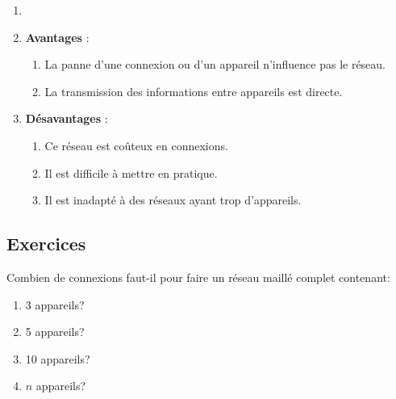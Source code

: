 \documentclass[11pt, a4paper]{book}
\begin{document}
\begin{remarques}
\begin{enumerate}
\item[]
\item {\bf Avantages} : 
	\begin{enumerate}
		\item La panne d'une connexion ou d'un appareil n'influence pas le réseau.
		\item  La transmission des informations entre appareils est directe.\\
	\end{enumerate}
\item {\bf Désavantages} :
	\begin{enumerate}
		\item Ce réseau est coûteux en connexions.
		\item Il est difficile à mettre en pratique.
		\item Il est inadapté à des réseaux ayant trop d'appareils.
	\end{enumerate}
\end{enumerate}
\end{remarques}

\subsection{Exercices}

\begin{exercice}
Combien de connexions faut-il pour faire un réseau maillé complet contenant:
\begin{enumerate}
	\item 3 appareils?
	\item 5 appareils?
	\item 10 appareils?
	\item $n$ appareils?
\end{enumerate}
\end{exercice}
\end{document}
